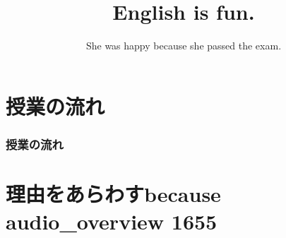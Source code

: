\documentclass[aspectratio=169,xcolor={dvipsnames,table}]{beamer}
\title{English is fun.}
\subtitle{She was happy because she passed the exam.}
\author{}
\institute[]{}
\date[]
\begin{document}
\begin{frame}[plain]
  \titlepage
\end{frame}

\section*{授業の流れ}
\begin{frame}[plain]
  \frametitle{授業の流れ}
  \tableofcontents
\end{frame}

\section{理由をあらわすbecause\\{\tiny audio\_overview 1655}\,{\scriptsize {}}}
\end{document}

